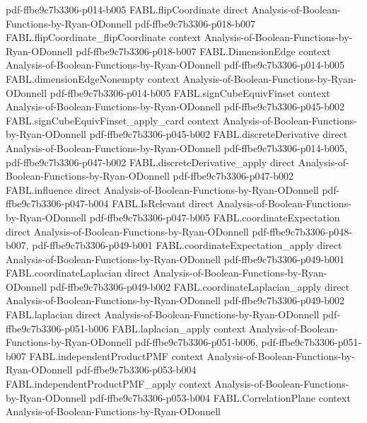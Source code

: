\begin{theorem}
  {pdf-ffbe9c7b3306-p014-b005}
\proofstep
  {FABL.flipCoordinate}
  {direct}
  {Analysis-of-Boolean-Functions-by-Ryan-ODonnell}
  {pdf-ffbe9c7b3306-p018-b007}
\proofstep
  {FABL.flipCoordinate_flipCoordinate}
  {context}
  {Analysis-of-Boolean-Functions-by-Ryan-ODonnell}
  {pdf-ffbe9c7b3306-p018-b007}
\proofstep
  {FABL.DimensionEdge}
  {context}
  {Analysis-of-Boolean-Functions-by-Ryan-ODonnell}
  {pdf-ffbe9c7b3306-p014-b005}
\proofstep
  {FABL.dimensionEdgeNonempty}
  {context}
  {Analysis-of-Boolean-Functions-by-Ryan-ODonnell}
  {pdf-ffbe9c7b3306-p014-b005}
\proofstep
  {FABL.signCubeEquivFinset}
  {context}
  {Analysis-of-Boolean-Functions-by-Ryan-ODonnell}
  {pdf-ffbe9c7b3306-p045-b002}
\proofstep
  {FABL.signCubeEquivFinset_apply_card}
  {context}
  {Analysis-of-Boolean-Functions-by-Ryan-ODonnell}
  {pdf-ffbe9c7b3306-p045-b002}
\proofstep
  {FABL.discreteDerivative}
  {direct}
  {Analysis-of-Boolean-Functions-by-Ryan-ODonnell}
  {pdf-ffbe9c7b3306-p014-b005,
    pdf-ffbe9c7b3306-p047-b002}
\proofstep
  {FABL.discreteDerivative_apply}
  {direct}
  {Analysis-of-Boolean-Functions-by-Ryan-ODonnell}
  {pdf-ffbe9c7b3306-p047-b002}
\proofstep
  {FABL.influence}
  {direct}
  {Analysis-of-Boolean-Functions-by-Ryan-ODonnell}
  {pdf-ffbe9c7b3306-p047-b004}
\proofstep
  {FABL.IsRelevant}
  {direct}
  {Analysis-of-Boolean-Functions-by-Ryan-ODonnell}
  {pdf-ffbe9c7b3306-p047-b005}
\proofstep
  {FABL.coordinateExpectation}
  {direct}
  {Analysis-of-Boolean-Functions-by-Ryan-ODonnell}
  {pdf-ffbe9c7b3306-p048-b007,
    pdf-ffbe9c7b3306-p049-b001}
\proofstep
  {FABL.coordinateExpectation_apply}
  {direct}
  {Analysis-of-Boolean-Functions-by-Ryan-ODonnell}
  {pdf-ffbe9c7b3306-p049-b001}
\proofstep
  {FABL.coordinateLaplacian}
  {direct}
  {Analysis-of-Boolean-Functions-by-Ryan-ODonnell}
  {pdf-ffbe9c7b3306-p049-b002}
\proofstep
  {FABL.coordinateLaplacian_apply}
  {direct}
  {Analysis-of-Boolean-Functions-by-Ryan-ODonnell}
  {pdf-ffbe9c7b3306-p049-b002}
\proofstep
  {FABL.laplacian}
  {direct}
  {Analysis-of-Boolean-Functions-by-Ryan-ODonnell}
  {pdf-ffbe9c7b3306-p051-b006}
\proofstep
  {FABL.laplacian_apply}
  {context}
  {Analysis-of-Boolean-Functions-by-Ryan-ODonnell}
  {pdf-ffbe9c7b3306-p051-b006,
    pdf-ffbe9c7b3306-p051-b007}
\proofstep
  {FABL.independentProductPMF}
  {context}
  {Analysis-of-Boolean-Functions-by-Ryan-ODonnell}
  {pdf-ffbe9c7b3306-p053-b004}
\proofstep
  {FABL.independentProductPMF_apply}
  {context}
  {Analysis-of-Boolean-Functions-by-Ryan-ODonnell}
  {pdf-ffbe9c7b3306-p053-b004}
\proofstep
  {FABL.CorrelationPlane}
  {context}
  {Analysis-of-Boolean-Functions-by-Ryan-ODonnell}

\end{theorem}
